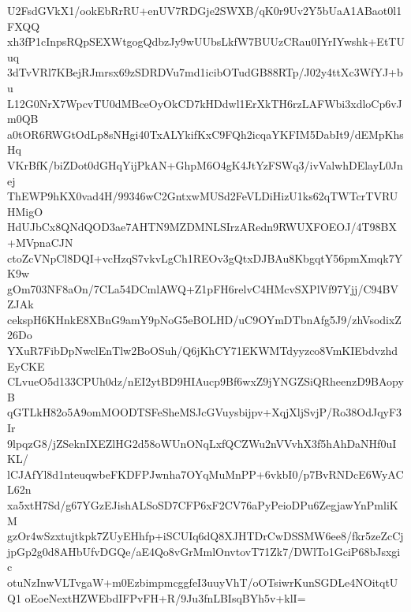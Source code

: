 U2FsdGVkX1/ookEbRrRU+enUV7RDGje2SWXB/qK0r9Uv2Y5bUaA1ABaot0l1FXQQ
xh3fP1cInpsRQpSEXWtgogQdbzJy9wUUbsLkfW7BUUzCRau0IYrIYwshk+EtTUuq
3dTvVRl7KBejRJmrsx69zSDRDVu7md1icibOTudGB88RTp/J02y4ttXc3WfYJ+bu
L12G0NrX7WpcvTU0dMBceOyOkCD7kHDdwl1ErXkTH6rzLAFWbi3xdloCp6vJm0QB
a0tOR6RWGtOdLp8sNHgi40TxALYkifKxC9FQh2icqaYKFIM5DabIt9/dEMpKhsHq
VKrBfK/biZDot0dGHqYijPkAN+GhpM6O4gK4JtYzFSWq3/ivValwhDElayL0Jnej
ThEWP9hKX0vad4H/99346wC2GntxwMUSd2FeVLDiHizU1ks62qTWTcrTVRUHMigO
HdUJbCx8QNdQOD3ae7AHTN9MZDMNLSIrzARedn9RWUXFOEOJ/4T98BX+MVpnaCJN
ctoZcVNpCl8DQI+vcHzqS7vkvLgCh1REOv3gQtxDJBAu8KbgqtY56pmXmqk7YK9w
gOm703NF8aOn/7CLa54DCmlAWQ+Z1pFH6relvC4HMcvSXPlVf97Yjj/C94BVZJAk
cekspH6KHnkE8XBnG9amY9pNoG5eBOLHD/uC9OYmDTbnAfg5J9/zhVsodixZ26Do
YXuR7FibDpNwclEnTlw2BoOSuh/Q6jKhCY71EKWMTdyyzco8VmKIEbdvzhdEyCKE
CLvueO5d133CPUh0dz/nEI2ytBD9HIAucp9Bf6wxZ9jYNGZSiQRheenzD9BAopyB
qGTLkH82o5A9omMOODTSFeSheMSJcGVuysbijpv+XqjXljSvjP/Ro38OdJqyF3Ir
9lpqzG8/jZSeknIXEZlHG2d58oWUnONqLxfQCZWu2nVVvhX3f5hAhDaNHf0uIKL/
lCJAfYl8d1nteuqwbeFKDFPJwnha7OYqMuMnPP+6vkbI0/p7BvRNDcE6WyACL62n
xa5xtH7Sd/g67YGzEJishALSoSD7CFP6xF2CV76aPyPeioDPu6ZegjawYnPmliKM
gzOr4wSzxtujtkpk7ZUyEHhfp+iSCUIq6dQ8XJHTDrCwDSSMW6ee8/fkr5zeZcCj
jpGp2g0d8AHbUfvDGQe/aE4Qo8vGrMmlOnvtovT71Zk7/DWlTo1GciP68bJsxgic
otuNzInwVLTvgaW+m0EzbimpmcggfeI3uuyVhT/oOTsiwrKunSGDLe4NOitqtUQ1
oEoeNextHZWEbdIFPvFH+R/9Ju3fnLBIsqBYh5v+klI=
